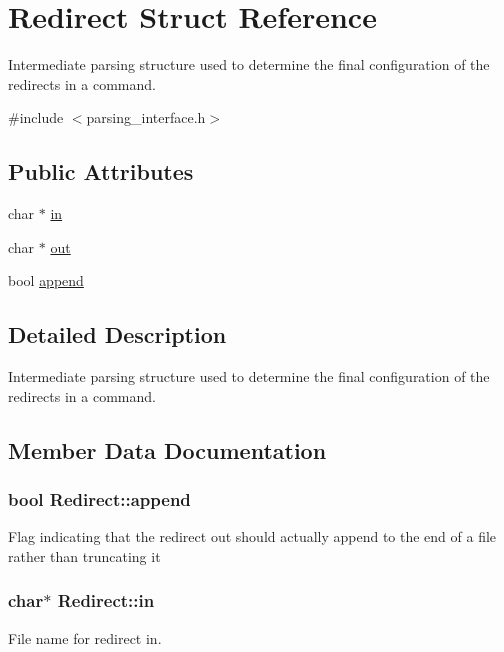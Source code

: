 \hypertarget{structRedirect}{}\section{Redirect Struct Reference}
\label{structRedirect}


Intermediate parsing structure used to determine the final configuration of the redirects in a command.  




{\ttfamily \#include $<$parsing\+\_\+interface.\+h$>$}

\subsection*{Public Attributes}
\begin{DoxyCompactItemize}
\item 
char $\ast$ \hyperlink{structRedirect_ab0e76f7e58a26d52216c8c4bfc9c2e83}{in}
\item 
char $\ast$ \hyperlink{structRedirect_a9d5efc0a96275e13eba0e71450771952}{out}
\item 
bool \hyperlink{structRedirect_aea1d3bd9c3b6e1dbf1661b616df9818e}{append}
\end{DoxyCompactItemize}


\subsection{Detailed Description}
Intermediate parsing structure used to determine the final configuration of the redirects in a command. 

\subsection{Member Data Documentation}
\subsubsection[{\texorpdfstring{append}{append}}]{\setlength{\rightskip}{0pt plus 5cm}bool Redirect\+::append}\hypertarget{structRedirect_aea1d3bd9c3b6e1dbf1661b616df9818e}{}\label{structRedirect_aea1d3bd9c3b6e1dbf1661b616df9818e}
Flag indicating that the redirect out should actually append to the end of a file rather than truncating it 
\subsubsection[{\texorpdfstring{in}{in}}]{\setlength{\rightskip}{0pt plus 5cm}char$\ast$ Redirect\+::in}\hypertarget{structRedirect_ab0e76f7e58a26d52216c8c4bfc9c2e83}{}\label{structRedirect_ab0e76f7e58a26d52216c8c4bfc9c2e83}
File name for redirect in. 
